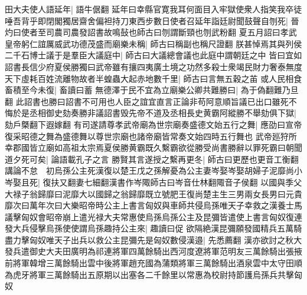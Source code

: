 田大夫使人語延年|{
	語牛倨翻}
延年曰幸縣官寛我耳何面目入牢獄使衆人指笑我卒徒唾吾背乎即閉閣獨居齋舍偏袒持刀東西步數日使者召延年詣廷尉聞鼓聲自刎死|{
	晉灼曰使者至司農司農發詔書故鳴鼔也師古曰刎謂斷頸也刎武粉翻}
夏五月詔曰孝武皇帝躬仁誼厲威武功德茂盛而廟樂未稱|{
	師古曰稱副也稱尺證翻}
朕甚悼焉其與列侯二千石博士議于是羣臣大議庭中|{
	師古曰大議總會議也此庭中謂朝廷之中}
皆曰宜如詔書長信少府夏侯勝獨曰武帝雖有攘四夷廣土境之功然多殺士衆竭民財力奢泰無度天下虛耗百姓流離物故者半蝗蟲大起赤地數千里|{
	師古曰言無五穀之苖}
或人民相食畜積至今未復|{
	畜讀曰蓄}
無德澤于民不宜為立廟樂公卿共難勝曰|{
	為于偽翻難乃旦翻}
此詔書也勝曰詔書不可用也人臣之誼宜直言正論非苟阿意順旨議已出口雖死不悔於是丞相御史劾奏勝非議詔書毁先帝不道及丞相長史黄霸阿縱勝不舉劾俱下獄|{
	劾戶槩翻下遐嫁翻}
有司遂請尊孝武帝廟為世宗廟奏盛德文始五行之舞|{
	應劭曰宣帝復采昭德之舞為盛德舞以尊世宗廟也諸帝廟皆常奏文始四時五行舞也}
武帝廵狩所幸郡國皆立廟如高祖太宗焉夏侯勝黄霸既久繫霸欲從勝受尚書勝辭以罪死霸曰朝聞道夕死可矣|{
	論語載孔子之言}
勝賢其言遂授之繫再更冬|{
	師古曰更歷也更音工衡翻}
講論不怠　初烏孫公主死漢復以楚王戊之孫解憂為公主妻岑娶岑娶胡婦子泥靡尚小岑娶且死|{
	復扶又翻妻七細翻漢書作岑陬師古曰岑音仕林翻陬音子侯翻}
以國與季父大禄子翁歸靡曰泥靡大以國歸之翁歸靡既立號肥王復尚楚主生三男兩女長男曰元貴靡次曰萬年次曰大樂昭帝時公主上書言匈奴與車師共侵烏孫唯天子幸救之漢養士馬議擊匈奴會昭帝崩上遣光禄大夫常惠使烏孫烏孫公主及昆彌皆遣使上書言匈奴復連發大兵侵擊烏孫使使謂烏孫趣持公主來|{
	趣讀曰促}
欲隔絶漢昆彌願發國精兵五萬騎盡力擊匈奴唯天子出兵以救公主昆彌先是匈奴數侵漢邉|{
	先悉薦翻}
漢亦欲討之秋大發兵遣御史大夫田廣明為祁連將軍四萬餘騎出西河度遼將軍范明友三萬餘騎出張掖前將軍韓增三萬餘騎出雲中後將軍趙充國為蒲類將軍三萬餘騎出酒泉雲中太守田順為虎牙將軍三萬餘騎出五原期以出塞各二千餘里以常惠為校尉持節護烏孫兵共擊匈奴

